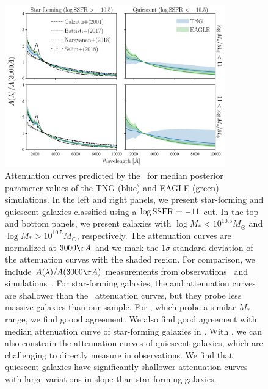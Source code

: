 \begin{figure}
\begin{center}
    \includegraphics[width=0.85\textwidth]{figs/abc_attenuation.pdf}
    \caption{\label{fig:atten}
    Attenuation curves predicted by the \eda~for median posterior parameter
    values of the TNG (blue) and EAGLE (green) simulations. In the left and
    right panels, we present star-forming and quiescent galaxies classified
    using a $\log {\rm SSFR} = -11$ cut. In the top and bottom panels, we
    present galaxies with $\log M_* < 10^{10.5} M_\odot$ and $\log M_* >
    10^{10.5} M_\odot$, respectively. The attenuation curves are normalized at
    $3000\AA$ and we mark the $1\sigma$ standard deviation of the attenuation 
    curves with the shaded region. For comparison, we include
    $A(\lambda)/A(3000\AA)$ measurements from observations~\citep{calzetti2000,
    battisti2017, salim2018} and simulations~\citep{narayanan2018}. 
    For star-forming galaxies, the \cite{calzetti2000} and \cite{battisti2017}
    attenuation curves are shallower than the \eda~attenuation curves, but 
    they probe less massive galaxies than our sample. For \cite{salim2018}, 
    which probe a similar $M_*$ range, we find goood agreement. We also find good agreement with 
    median attenuation curve of star-forming galaxies in \cite{narayanan2018}.
    With \eda, we can also constrain the attenuation curves of quiescent 
    galaxies, which are challenging to directly measure in observations. We
    find that quiescent galaxies have significantly shallower attenuation 
    curves with large variations in slope than star-forming galaxies. 
    }
\end{center}
\end{figure}

